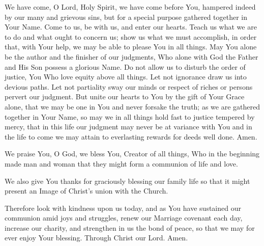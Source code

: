 
We have come, O Lord, Holy Spirit, we have come before You, hampered indeed by our many and grievous sins, but for a special purpose gathered together in Your Name.
Come to us, be with us, and enter our hearts.
Teach us what we are to do and what ought to concern us;
show us what we must accomplish, in order that, with Your help, we may be able to please You in all things.
May You alone be the author and the finisher of our judgments, Who alone with God the Father and His Son possess a glorious Name.
Do not allow us to disturb the order of justice, You Who love equity above all things.
Let not ignorance draw us into devious paths.
Let not partiality sway our minds or respect of riches or persons pervert our judgment.
But unite our hearts to You by the gift of Your Grace alone, that we may be one in You and never forsake the truth;
as we are gathered together in Your Name, so may we in all things hold fast to justice tempered by mercy, that in this life our judgment may never be at variance with You and in the life to come we may attain to everlasting rewards for deeds well done.
Amen.

We praise You, O God, we bless You, Creator of all things, Who in the beginning made man and woman that they might form a communion of life and love.

We also give You thanks for graciously blessing our family life so that it might present an Image of Christ's union with the Church.

Therefore look with kindness upon us today, and as You have sustained our communion amid joys and struggles, renew our Marriage covenant each day, increase our charity, and strengthen in us the bond of peace, so that we may for ever enjoy Your blessing.
Through Christ our Lord. Amen.

